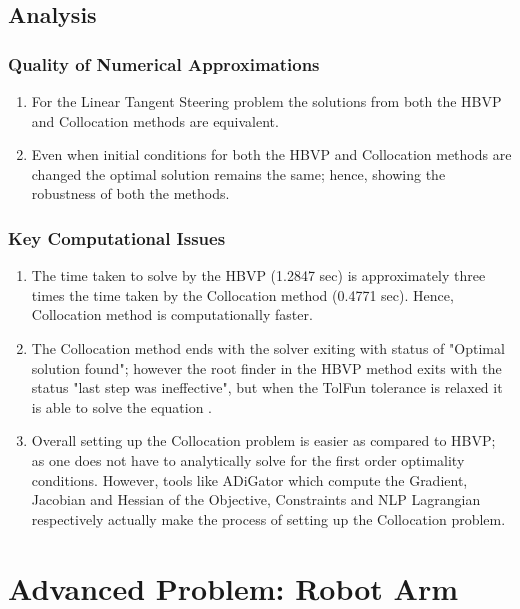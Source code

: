 \documentclass[11pt,usenames]{article}
\begin{document}
	\newpage
	
	
	
	\subsection{Analysis}
	
	\subsubsection{Quality of Numerical Approximations}
	
	\begin{enumerate}
		\item For the Linear Tangent Steering problem the solutions from both the HBVP and Collocation methods are equivalent. 
		\item Even when initial conditions for both the HBVP and Collocation methods are changed the optimal solution remains the same; hence, showing the robustness of both the methods.
	\end{enumerate}
	
	\subsubsection{Key Computational Issues}
	
	\begin{enumerate}
		\item The time taken to solve by the HBVP (1.2847 sec) is approximately three times the time taken by the Collocation method (0.4771 sec). Hence, Collocation method is computationally faster.
		\item The Collocation method ends with the solver exiting with status of "Optimal solution found"; however the root finder in the HBVP method exits with the status "last step was ineffective", but when the TolFun tolerance is relaxed it is able to solve the equation .
		\item Overall setting up the Collocation problem is easier as compared to HBVP; as one does not have to analytically solve for the first order optimality conditions. However, tools like ADiGator which compute the Gradient, Jacobian and Hessian of the Objective, Constraints and NLP Lagrangian respectively actually make the process of setting up the Collocation problem.
	\end{enumerate}
	
	\newpage
	
	
	\section{Advanced Problem: Robot Arm}
	
\end{document}
